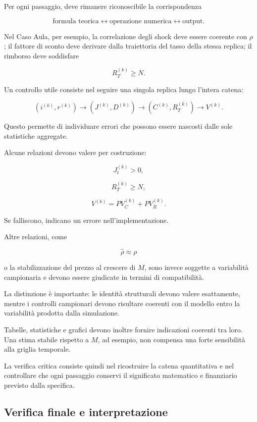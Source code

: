 Per ogni passaggio, deve rimanere riconoscibile la corrispondenza

\[
\text{formula teorica}
\longleftrightarrow
\text{operazione numerica}
\longleftrightarrow
\text{output}.
\]

Nel Caso Aula, per esempio, la correlazione degli shock deve essere coerente
con \(\rho\); il fattore di sconto deve derivare dalla traiettoria del tasso
della stessa replica; il rimborso deve soddisfare

\[
R_T^{(k)}\geq N.
\]

Un controllo utile consiste nel seguire una singola replica lungo l'intera
catena:

\[
\left(
i^{(k)},r^{(k)}
\right)
\longrightarrow
\left(
J^{(k)},D^{(k)}
\right)
\longrightarrow
\left(
C^{(k)},R_T^{(k)}
\right)
\longrightarrow
V^{(k)}.
\]

Questo permette di individuare errori che possono essere nascosti dalle sole
statistiche aggregate.

Alcune relazioni devono valere per costruzione:

\[
J_t^{(k)}>0,
\]

\[
R_T^{(k)}\geq N,
\]

\[
V^{(k)}
=
PV_C^{(k)}
+
PV_R^{(k)}.
\]

Se falliscono, indicano un errore nell'implementazione.

Altre relazioni, come

\[
\widehat\rho\approx\rho
\]

\noindent o la stabilizzazione del prezzo al crescere di \(M\), sono invece soggette a
variabilit\`a campionaria e devono essere giudicate in termini di
compatibilit\`a.

La distinzione \`e importante: le identit\`a strutturali devono valere
esattamente, mentre i controlli campionari devono risultare coerenti con il
modello entro la variabilit\`a prodotta dalla simulazione.

Tabelle, statistiche e grafici devono inoltre fornire indicazioni coerenti tra
loro. Una stima stabile rispetto a \(M\), ad esempio, non compensa una forte
sensibilit\`a alla griglia temporale.

La verifica critica consiste quindi nel ricostruire la catena quantitativa e
nel controllare che ogni passaggio conservi il significato matematico e
finanziario previsto dalla specifica.

\subsection{Verifica finale e interpretazione}

